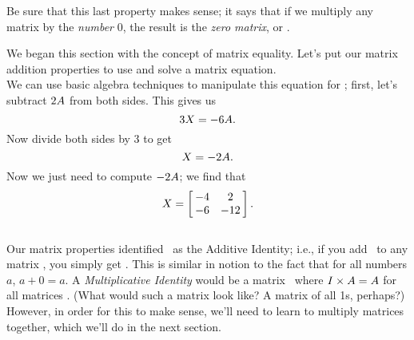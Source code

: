 
Be sure that this last property makes sense; it says that if we multiply any matrix by the \textit{number} 0, the result is the \textit{zero matrix}, or \tto.

We began this section with the concept of matrix equality. Let's put our matrix addition properties to use and solve a matrix equation.\\

{We can use basic algebra techniques to manipulate this equation for \ttx; first, let's subtract $2\tta$ from both sides. This gives us $$3\ttx = -6\tta.$$ Now divide both sides by 3 to get $$\ttx = -2\tta.$$ Now we just need to compute $-2\tta$; we find that $$\ttx = \bmx{cc} -4&2\\ -6&-12\emx.$$ \ }\\ %

Our matrix properties identified \tto\ as the Additive Identity; i.e., if you add \tto\ to any matrix \tta, you simply get \tta. This is similar in notion to the fact that for all numbers $a$, $a+0 = a$. A \textit{Multiplicative Identity} would be a matrix \tti\ where $\tti\times\tta = \tta$ for all matrices \tta. (What would such a matrix look like? A matrix of all 1s, perhaps?) However, in order for this to make sense, we'll need to learn to multiply matrices together, which we'll do in the next section. \\

